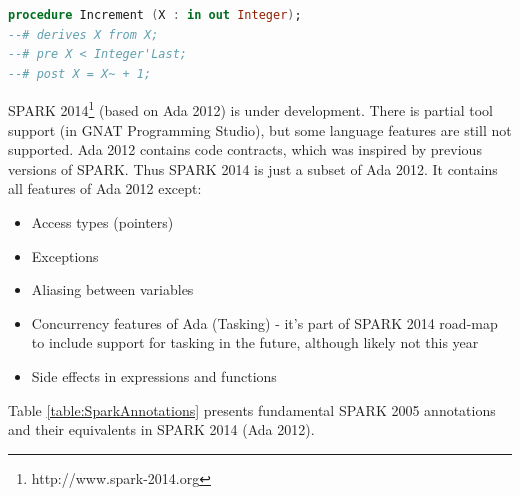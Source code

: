 \begin{lstlisting}[language=ada, frame=single, gobble=0, caption={Sample SPARK procedure with code contracts}, label={listing:SPARK2005Contracts}]
procedure Increment (X : in out Integer);
--# derives X from X;
--# pre X < Integer'Last;
--# post X = X~ + 1;
\end{lstlisting} 

SPARK 2014\footnote{http://www.spark-2014.org} (based on Ada 2012) is under development. There is partial tool support (in GNAT Programming Studio), but some language features are still not supported. Ada 2012 contains code contracts, which was inspired by previous versions of SPARK. Thus SPARK 2014 is just a subset of Ada 2012. \cite{Spark2014:Paper} It contains all features of Ada 2012 except:
\begin{itemize} \itemsep1pt \parskip0pt 
 	\item Access types (pointers)
 	\item Exceptions
	\item Aliasing between variables
	\item Concurrency features of Ada (Tasking) - it's part of SPARK 2014 road-map to include support for tasking in the future, although likely not this year
	\item Side effects in expressions and functions
\end{itemize}

Table \ref{table:SparkAnnotations} presents fundamental SPARK 2005 annotations and their equivalents in SPARK 2014 (Ada 2012).

